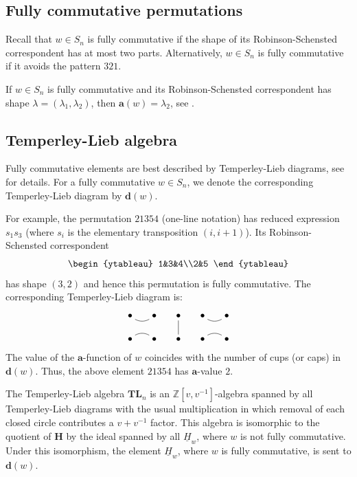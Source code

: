 \documentclass[a4paper]{amsart}
\begin{document}
\subsection{Fully commutative permutations}\label{s4.1}

Recall that $w\in S_n$ is fully commutative if the shape of its 
Robinson-Schensted correspondent has at most two parts.
Alternatively, $w\in S_n$ is fully commutative if it
avoids the pattern $321$. 

If $w\in S_n$ is fully commutative and  its 
Robinson-Schensted correspondent has shape $\lambda=(\lambda_1,\lambda_2)$,
then $\mathbf{a}(w)=\lambda_2$, see \cite{MT}.

\subsection{Temperley-Lieb algebra}\label{s4.2}

Fully commutative elements are best described by 
Temperley-Lieb diagrams, see \cite{MMM} for details.
For a fully commutative $w\in S_n$, we denote the
corresponding Temperley-Lieb diagram by $\mathbf{d}(w)$.

For example, the permutation $21354$
(one-line notation) has reduced expression $s_1s_3$
(where $s_i$ is the elementary transposition $(i,i+1)$).
Its Robinson-Schensted correspondent  
\begin{displaymath}
\begin{ytableau}
1&3&4\\2&5 
\end{ytableau}
\end{displaymath}
has shape $(3,2)$ and hence this permutation is fully commutative.
The corresponding Temperley-Lieb diagram is:
\begin{displaymath}
\xymatrix@R=5mm@C=5mm{
\bullet\ar@{-}@/_/[r]&\bullet&\bullet\ar@{-}[d]&
\bullet\ar@{-}@/_/[r]&\bullet\\
\bullet\ar@{-}@/^/[r]&\bullet&\bullet&\bullet\ar@{-}@/^/[r]&\bullet
}
\end{displaymath}
The value of the $\mathbf{a}$-function of $w$ coincides with
the number of cups (or caps) in $\mathbf{d}(w)$.
Thus, the above element $21354$ has $\mathbf{a}$-value $2$.

The Temperley-Lieb algebra $\mathbf{TL}_n$ 
is an $\mathbb{Z}[v,v^{-1}]$-algebra spanned by all Temperley-Lieb
diagrams with the usual multiplication in which 
removal of each closed circle contributes a $v+v^{-1}$ factor.
This algebra is isomorphic to the quotient of 
$\mathbf{H}$ by the ideal spanned by all $\underline{H}_w$,
where $w$ is not fully commutative. Under this isomorphism,
the element $\underline{H}_w$, where $w$ is fully commutative,
is sent to $\mathbf{d}(w)$.
\end{document}
